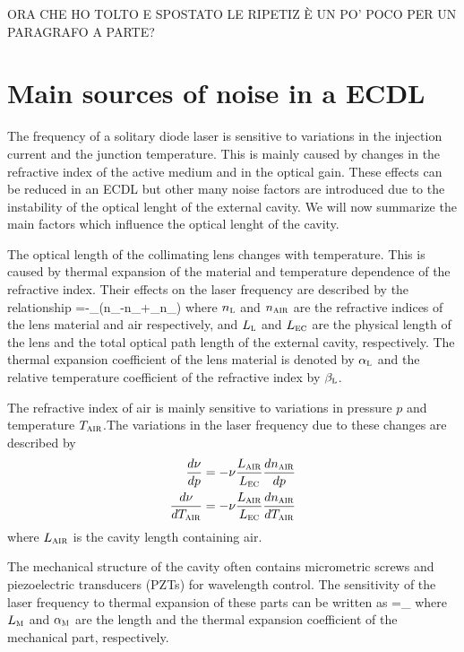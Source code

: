 ORA CHE HO TOLTO E SPOSTATO LE RIPETIZ È UN PO' POCO PER UN PARAGRAFO A PARTE?


	\section{Main sources of noise in a ECDL}
The frequency of a solitary diode laser is sensitive to variations in the injection current and the junction temperature. This is mainly caused by changes in the refractive index of the active medium and in the optical gain. 
These effects can be reduced in an ECDL but other many noise factors are introduced due to the instability of the optical lenght of the external cavity.
We will now summarize the main factors which influence the optical lenght of the cavity.

The optical length of the collimating lens changes with temperature. This is caused by thermal expansion of the material and temperature dependence of the refractive index. Their effects on the laser frequency are described by the relationship 
\mate
{}=-\nu{}\alpha_{}\left(n_{}-n_{}+\beta_{}n_{}\right)
\label{effect1}
\atem
where $n_{\mbox{\footnotesize{\scshape{l}}}}$ and $n_{\mbox{\footnotesize{\scshape{air}}}}$ are the refractive indices of the lens material and air respectively, and $L_{\mbox{\footnotesize{\scshape{l}}}}$ and $L_{\mbox{\footnotesize{\scshape{ec}}}}$ are the physical length of the lens and the total optical path length of the external cavity, respectively. The thermal expansion coefficient of the lens material is denoted by $\alpha_{\mbox{\footnotesize{\scshape{l}}}}$ and the relative temperature coefficient of the refractive index by $\beta_{\mbox{\footnotesize{\scshape{l}}}}$. 

The refractive index of air is mainly sensitive to variations in pressure $p$ and temperature $T_{\mbox{\footnotesize{\scshape{air}}}}$.The variations in the laser frequency due to these changes are described by
\begin{align}
\frac{d\nu}{dp}=-\nu\frac{L_{\mbox{\footnotesize{\scshape{air}}}}}{L_{\mbox{\footnotesize{\scshape{ec}}}}}\frac{dn_{\mbox{\footnotesize{\scshape{air}}}}}{dp}\label{effect2}\\
\frac{d\nu}{dT_{\mbox{\footnotesize{\scshape{air}}}}}=-\nu\frac{L_{\mbox{\footnotesize{\scshape{air}}}}}{L_{\mbox{\footnotesize{\scshape{ec}}}}}\frac{dn_{\mbox{\footnotesize{\scshape{air}}}}}{dT_{\mbox{\footnotesize{\scshape{air}}}}}
\label{effect3}
\end{align}
where $L_{\mbox{\footnotesize{\scshape{air}}}}$ is the cavity length containing air.	

The mechanical structure of the cavity often contains micrometric screws and piezoelectric transducers (PZTs) for wavelength control. The sensitivity of the laser frequency to thermal expansion of these parts can be written as
\mate
{}=\pm\nu{}\alpha_{}
\label{effect4}
\atem
where $L_{\mbox{\footnotesize{\scshape{m}}}}$ and $\alpha_{\mbox{\footnotesize{\scshape{m}}}}$ are the length and the thermal expansion coefficient of the mechanical part, respectively.

